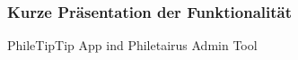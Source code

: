 \begin{frame}
\frametitle{Kurze Präsentation der Funktionalität}
	PhileTipTip App ind Philetairus Admin Tool

\end{frame}